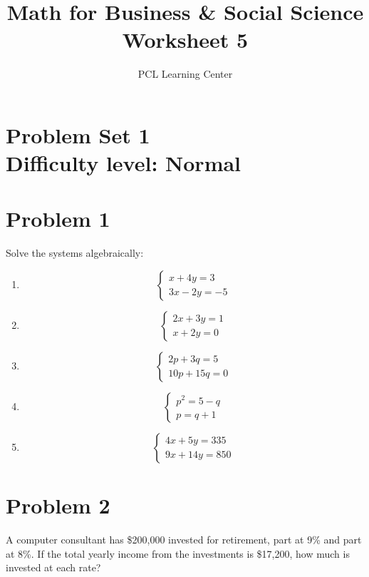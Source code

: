 \documentclass[12pt]{article}
\title{Math for Business \& Social Science\\ Worksheet 5}
\author{PCL Learning Center}
\date{}
\begin{document}
\maketitle

\section*{Problem Set 1\\Difficulty level: Normal}
\section*{Problem 1}
Solve the systems algebraically:

\begin{enumerate}[label=(\alph*)]
    \item 
    \[
    \begin{cases}
    x + 4y = 3 \\
    3x - 2y = -5
    \end{cases}
    \]
    
    \item 
    \[
    \begin{cases}
    2x + 3y = 1 \\
    x + 2y = 0
    \end{cases}
    \]
    
    \item 
    \[
    \begin{cases}
    2p + 3q = 5 \\
    10p + 15q = 0
    \end{cases}
    \]
    
    \item 
    \[
    \begin{cases}
    p^2 = 5 - q \\
    p = q + 1
    \end{cases}
    \]
    
    \item 
    \[
    \begin{cases}
    4x + 5y = 335 \\
    9x + 14y = 850
    \end{cases}
    \]
\end{enumerate}

\section*{Problem 2}
A computer consultant has \$200{,}000 invested for retirement, part at 9\% and part at 8\%. If the total yearly income from the investments is \$17{,}200, how much is invested at each rate?
\end{document}
